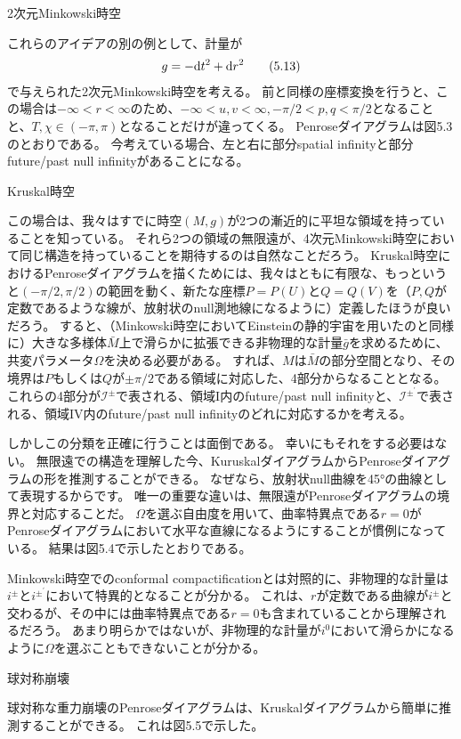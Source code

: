 \documentclass[a4paper, 12pt]{jsarticle}
\newcommand{\ddif}{{\rm d}}
\begin{document}
\begin{description}
	\item[2次元Minkowski時空]
\end{description}
これらのアイデアの別の例として、計量が
\begin{align}
	g = -\ddif t^2 + \ddif r^2 \tag{5.13}
\end{align}
で与えられた2次元Minkowski時空を考える。
前と同様の座標変換を行うと、この場合は$-\infty < r < \infty$のため、$-\infty < u, v < \infty, -\pi/2 < p, q < \pi/2$となることと、$T, \chi \in (-\pi, \pi)$となることだけが違ってくる。
Penroseダイアグラムは図5.3のとおりである。
今考えている場合、左と右に部分spatial infinityと部分future/past null infinityがあることになる。

\begin{description}
	\item[Kruskal時空]
\end{description}
この場合は、我々はすでに時空$(M, g)$が2つの漸近的に平坦な領域を持っていることを知っている。
それら2つの領域の無限遠が、4次元Minkowski時空において同じ構造を持っていることを期待するのは自然なことだろう。
Kruskal時空におけるPenroseダイアグラムを描くためには、我々はともに有限な、もっというと$(-\pi/2, \pi/2)$の範囲を動く、新たな座標$P=P(U)$と$Q=Q(V)$を（$P, Q$が定数であるような線が、放射状のnull測地線になるように）定義したほうが良いだろう。
すると、（Minkowski時空においてEinsteinの静的宇宙を用いたのと同様に）大きな多様体$\bar{M}$上で滑らかに拡張できる非物理的な計量$\bar{g}$を求めるために、共変パラメータ$\Omega$を決める必要がある。
すれば、$M$は$\bar{M}$の部分空間となり、その境界は$P$もしくは$Q$が$\pm \pi/2$である領域に対応した、4部分からなることとなる。
これらの4部分が$\mathcal{I}^{\pm}$で表される、領域I内のfuture/past null infinityと、$\mathcal{I}^{\pm^{\prime}}$で表される、領域IV内のfuture/past null infinityのどれに対応するかを考える。

しかしこの分類を正確に行うことは面倒である。
幸いにもそれをする必要はない。
無限遠での構造を理解した今、KuruskalダイアグラムからPenroseダイアグラムの形を推測することができる。
なぜなら、放射状null曲線を45°の曲線として表現するからです。
唯一の重要な違いは、無限遠がPenroseダイアグラムの境界と対応することだ。
$\Omega$を選ぶ自由度を用いて、曲率特異点である$r=0$がPenroseダイアグラムにおいて水平な直線になるようにすることが慣例になっている。
結果は図5.4で示したとおりである。

Minkowski時空でのconformal compactificationとは対照的に、非物理的な計量は$i^{\pm}$と$i^{\pm^{\prime}}$において特異的となることが分かる。
これは、$r$が定数である曲線が$i^{\pm}$と交わるが、その中には曲率特異点である$r=0$も含まれていることから理解されるだろう。
あまり明らかではないが、非物理的な計量が$i^0$において滑らかになるように$\Omega$を選ぶこともできないことが分かる。

\begin{description}
	\item[球対称崩壊]
\end{description}

球対称な重力崩壊のPenroseダイアグラムは、Kruskalダイアグラムから簡単に推測することができる。
これは図5.5で示した。
\end{document}
